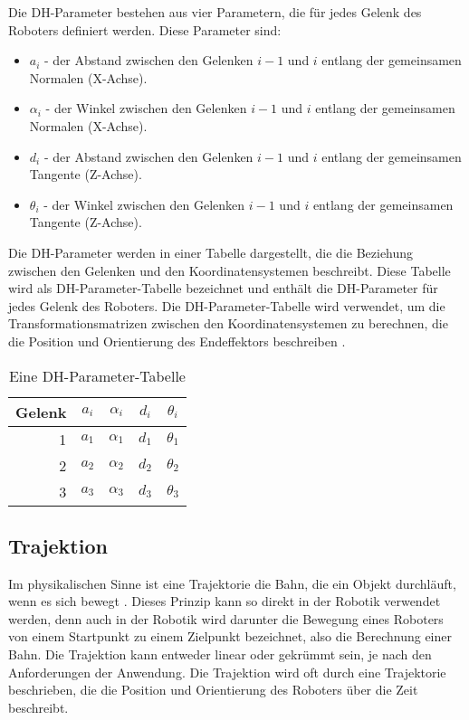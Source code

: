 \noindent
Die DH-Parameter bestehen aus vier Parametern, die für jedes Gelenk des Roboters definiert werden. Diese Parameter sind:
\begin{itemize}
    \item $a_i$ - der Abstand zwischen den Gelenken $i-1$ und $i$ entlang der gemeinsamen Normalen (X-Achse).
    \item $\alpha_i$ - der Winkel zwischen den Gelenken $i-1$ und $i$ entlang der gemeinsamen Normalen (X-Achse).
    \item $d_i$ - der Abstand zwischen den Gelenken $i-1$ und $i$ entlang der gemeinsamen Tangente (Z-Achse).
    \item $\theta_i$ - der Winkel zwischen den Gelenken $i-1$ und $i$ entlang der gemeinsamen Tangente (Z-Achse).
\end{itemize}
Die DH-Parameter werden in einer Tabelle dargestellt, die die Beziehung zwischen den Gelenken und den Koordinatensystemen beschreibt. Diese Tabelle wird als DH-Parameter-Tabelle bezeichnet und enthält die DH-Parameter für jedes Gelenk des Roboters. Die DH-Parameter-Tabelle wird verwendet, um die Transformationsmatrizen zwischen den Koordinatensystemen zu berechnen, die die Position und Orientierung des Endeffektors beschreiben \cite{msi_robo_vorlesung}.\\
\begin{table}
    \centering
    \begin{tabular}[H]{r|c|c|c|c}
        \textbf{Gelenk} & \textbf{$a_i$} & \textbf{$\alpha_i$} & \textbf{$d_i$} & \textbf{$\theta_i$} \\
        \hline
        1 & $a_1$ & $\alpha_1$ & $d_1$ & $\theta_1$ \\
        2 & $a_2$ & $\alpha_2$ & $d_2$ & $\theta_2$ \\
        3 & $a_3$ & $\alpha_3$ & $d_3$ & $\theta_3$ \\
    \end{tabular}
    \label{tab:DH-Parameter}
    \caption{Eine DH-Parameter-Tabelle}
\end{table}

\subsection{Trajektion}\label{subsec:Trajektion}
Im physikalischen Sinne ist eine Trajektorie die Bahn, die ein Objekt durchläuft, wenn es sich bewegt \cite{wiki-trajektorie}. Dieses Prinzip kann so direkt in der Robotik verwendet werden, denn auch in der Robotik wird darunter die Bewegung eines Roboters von einem Startpunkt zu einem Zielpunkt bezeichnet, also die Berechnung einer Bahn. Die Trajektion kann entweder linear oder gekrümmt sein, je nach den Anforderungen der Anwendung. Die Trajektion wird oft durch eine Trajektorie beschrieben, die die Position und Orientierung des Roboters über die Zeit beschreibt.
\\

